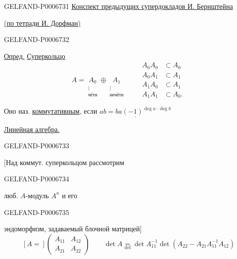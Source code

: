 \begin{GelfandAdjacentEvidence}{GELFAND-P000673}{1}
\underline{Конспект предыдущих супердокладов И. Бернштейна}

\uline{(по тетради И. Дорфман)}
\end{GelfandAdjacentEvidence}
\begin{GelfandAdjacentEvidence}{GELFAND-P000673}{2}


\underline{Опред.} \underline{Суперкольцо}
\[
A=\underset{\substack{\vert\\\text{чётн}}}{A_0}\oplus
  \underset{\substack{\vert\\\text{нечётн}}}{A_1}
\qquad
\begin{aligned}
 A_0A_0&\subset A_0\\
 A_0A_1&\subset A_1\\
 A_1A_0&\subset A_1\\
 A_1A_1&\subset A_0.
\end{aligned}
\]

Оно наз. \underline{коммутативным}, если
\(\underline{ab=ba(-1)^{\deg a\cdot\deg b}}\)

\underline{Линейная алгебра.}
\end{GelfandAdjacentEvidence}
\begin{GelfandAdjacentEvidence}{GELFAND-P000673}{3}

[Над коммут. суперкольцом рассмотрим
\end{GelfandAdjacentEvidence}
\begin{GelfandAdjacentEvidence}{GELFAND-P000673}{4}

люб. \(A\)-модуль \(A^n\) и его
\end{GelfandAdjacentEvidence}
\begin{GelfandAdjacentEvidence}{GELFAND-P000673}{5}

эндоморфизм, задаваемый блочной матрицей]
\[
[A=]\begin{pmatrix}A_{11}&A_{12}\\ A_{21}&A_{22}\end{pmatrix}
\qquad
\det A\underset{\mathrm{def}}{=}
\det A_{11}^{-1}\det(A_{22}-A_{21}A_{11}^{-1}A_{12})
\]
\end{GelfandAdjacentEvidence}
